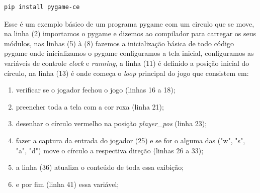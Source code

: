 \newpage
\begin{lstlisting}[language=bash,breaklines, caption= Instalação Pygame]
pip install pygame-ce
\end{lstlisting}

Esse é um exemplo básico de um programa pygame com um circulo que se move, na linha (2) importamos o pygame e dizemos ao compilador para carregar os seus módulos, nas linhas (5) à (8) fazemos a inicialização básica de todo código pygame onde inicializamos o pygame configuramos a tela inicial, configuramos as variáveis de controle \textit{clock} e \textit{running}, a linha (11) é definido a posição inicial do círculo, na linha (13) é onde começa o \textit{loop} principal do jogo que consistem em:
\begin{enumerate}
    \item verificar se o jogador fechou o jogo (linhas 16 a 18);
    \item preencher toda a tela com a cor roxa (linha 21);
    \item desenhar o círculo vermelho na posição \textit{player\_pos} (linha 23);
    \item fazer a captura da entrada do jogador (25) e se for o alguma das ("w", "s", "a", "d") move o círculo a respectiva direção (linhas 26 a 33);
    \item a linha (36) atualiza o conteúdo de toda essa exibição;
    \item e por fim (linha 41) essa variável;
\end{enumerate}

